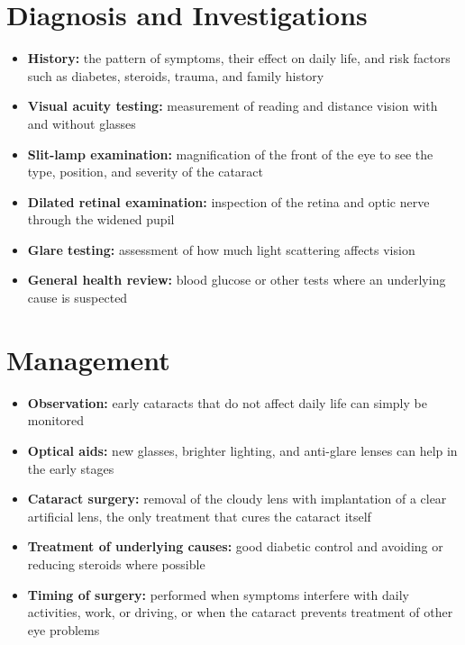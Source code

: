 \section*{Diagnosis and Investigations}
\begin{itemize}
    \item \textbf{History:} the pattern of symptoms, their effect on daily life, and risk factors such as diabetes, steroids, trauma, and family history
    \item \textbf{Visual acuity testing:} measurement of reading and distance vision with and without glasses
    \item \textbf{Slit-lamp examination:} magnification of the front of the eye to see the type, position, and severity of the cataract
    \item \textbf{Dilated retinal examination:} inspection of the retina and optic nerve through the widened pupil
    \item \textbf{Glare testing:} assessment of how much light scattering affects vision
    \item \textbf{General health review:} blood glucose or other tests where an underlying cause is suspected
\end{itemize}

\section*{Management}
\begin{itemize}
    \item \textbf{Observation:} early cataracts that do not affect daily life can simply be monitored
    \item \textbf{Optical aids:} new glasses, brighter lighting, and anti-glare lenses can help in the early stages
    \item \textbf{Cataract surgery:} removal of the cloudy lens with implantation of a clear artificial lens, the only treatment that cures the cataract itself
    \item \textbf{Treatment of underlying causes:} good diabetic control and avoiding or reducing steroids where possible
    \item \textbf{Timing of surgery:} performed when symptoms interfere with daily activities, work, or driving, or when the cataract prevents treatment of other eye problems
\end{itemize}

